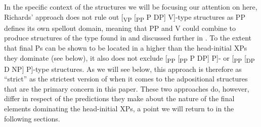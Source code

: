 \documentclass[output=paper]{LSP/langsci}
\begin{document}
In the specific context of the structures we will be focusing our attention on here, Richards’ approach does not rule out [\textsubscript{VP} [\textsubscript{PP} P DP] V]-type structures as PP defines its own spellout domain, meaning that PP and V could combine to produce structures of the type found in  and discussed further in . To the extent that final Ps can be shown to be located in a higher  than the head-initial XPs they dominate (see  below), it also does not exclude [\textsubscript{PP} [\textsubscript{PP} P DP] P]- or [\textsubscript{PP} [\textsubscript{DP} D NP] P]-type structures. As we will see below, this approach is therefore as “strict” as the strictest version of  when it comes to the adpositional structures that are the primary concern in this paper. These two approaches do, however, differ in respect of the predictions they make about the nature of the final elements dominating the head-initial XPs, a point we will return to in the following sections.
\end{document}
